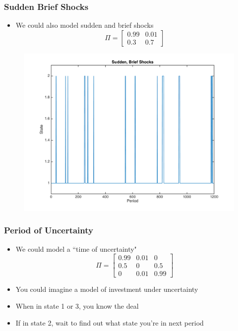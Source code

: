 \documentclass{beamer}
\begin{document}
\begin{frame}
\frametitle[alignment=center]{Sudden Brief Shocks}
\begin{itemize}
\item We could also model sudden and brief shocks
$$\Pi=\left[\begin{array}{cc}0.99 & 0.01 \\ 0.3 & 0.7\end{array}\right]$$
\end{itemize}
\begin{figure}
\centering
\includegraphics[scale=0.4]{SuddenShocks}
\end{figure}
\end{frame}

\begin{frame}
\frametitle[alignment=center]{Period of Uncertainty}
\begin{itemize}
\item We could model a ``time of uncertainty"
$$\Pi=\left[\begin{array}{ccc}0.99 & 0.01 & 0 \\ 0.5 & 0 & 0.5 \\ 0 & 0.01 & 0.99\end{array}\right]$$
\item You could imagine a model of investment under uncertainty
\item When in state 1 or 3, you know the deal
\item If in state 2, wait to find out what state you're in next period
\end{itemize}
\end{frame}
\end{document}
